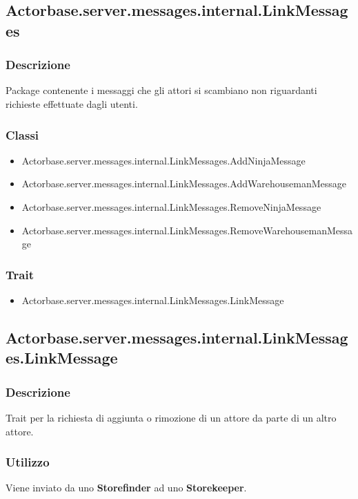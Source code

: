 \documentclass[a4paper]{article}
\begin{document}
		\subsection{Actorbase.server.messages.internal.LinkMessages}
			
			\subsubsection{Descrizione}
				Package contenente i messaggi che gli attori si scambiano non riguardanti richieste effettuate dagli utenti.
				
			\subsubsection{Classi}
				\begin{itemize}
					\item Actorbase.server.messages.internal.LinkMessages.AddNinjaMessage
					\item Actorbase.server.messages.internal.LinkMessages.AddWarehousemanMessage
					\item Actorbase.server.messages.internal.LinkMessages.RemoveNinjaMessage
					\item Actorbase.server.messages.internal.LinkMessages.RemoveWarehousemanMessage
				\end{itemize}
			
			\subsubsection{Trait}
				\begin{itemize}
					\item Actorbase.server.messages.internal.LinkMessages.LinkMessage
				\end{itemize}
				
		\subsection{Actorbase.server.messages.internal.LinkMessages.LinkMessage}
			\subsubsection{Descrizione}
				Trait per la richiesta di aggiunta o rimozione di un attore da parte di un altro attore.
				
			\subsubsection{Utilizzo}
				Viene inviato da uno \textbf{Storefinder} ad uno \textbf{Storekeeper}.
				
\end{document}

